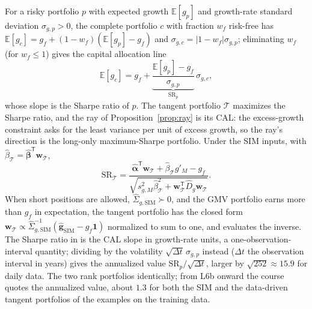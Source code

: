 \documentclass[11pt]{article}
\newcommand{\E}{\mathbb{E}}
\newcommand{\bw}{\mathbf w}
\newcommand{\bg}{\mathbf g}
\newcommand{\bal}{\boldsymbol\alpha}
\newcommand{\bbe}{\boldsymbol\beta}
\newcommand{\Tan}{\mathcal T}
\newcommand{\SigSIM}{\hat\Sigma_{g,\mathrm{SIM}}}
\newcommand{\gSIM}{\hat{\bg}_{\mathrm{SIM}}}
\begin{document}
For a risky portfolio $p$ with expected growth $\E[g_p]$ and growth-rate standard deviation $\sigma_{g,p}>0$, the complete portfolio $c$ with fraction $w_f$ risk-free has $\E[g_c]=g_f+(1-w_f)(\E[g_p]-g_f)$ and $\sigma_{g,c}=|1-w_f|\sigma_{g,p}$; eliminating $w_f$ (for $w_f\le1$) gives the capital allocation line
\begin{equation}
  \label{eq:cal}
  \E[g_c]=g_f+\underbrace{\frac{\E[g_p]-g_f}{\sigma_{g,p}}}_{\mathrm{SR}_p}\,\sigma_{g,c},
\end{equation}
whose slope is the Sharpe ratio of $p$. The tangent portfolio $\Tan$ maximizes the Sharpe ratio, and the ray of Proposition~\ref{prop:ray} is its CAL: the excess-growth constraint asks for the least variance per unit of excess growth, so the ray's direction is the long-only maximum-Sharpe portfolio. Under the SIM inputs, with $\hat\beta_{\Tan}=\hat{\bbe}^{\mathsf T}\bw_{\Tan}$,
\begin{equation}
  \label{eq:sim-sharpe}
  \mathrm{SR}_{\Tan}
  =\frac{\hat{\bal}^{\mathsf T}\bw_{\Tan}+\hat\beta_{\Tan}g'_M-g_f}
  {\sqrt{s^2_{g,M}\hat\beta_{\Tan}^2+\bw_{\Tan}^{\mathsf T}\hat D_g\bw_{\Tan}}} .
\end{equation}
When short positions are allowed, $\SigSIM\succ0$, and the GMV portfolio earns more than $g_f$ in expectation, the tangent portfolio has the closed form $\bw_{\Tan}\propto\SigSIM^{-1}(\gSIM-g_f\mathbf 1)$ normalized to sum to one, and  evaluates the inverse. The Sharpe ratio in  is the CAL slope in growth-rate units, a one-observation-interval quantity; dividing by the volatility $\sqrt{\Delta t}\,\sigma_{g,p}$ instead ($\Delta t$ the observation interval in years) gives the annualized value $\mathrm{SR}_p/\sqrt{\Delta t}$, larger by $\sqrt{252}\approx15.9$ for daily data. The two rank portfolios identically; from L6b onward the course quotes the annualized value, about $1.3$ for both the SIM and the data-driven tangent portfolios of the examples on the training data.
\end{document}
